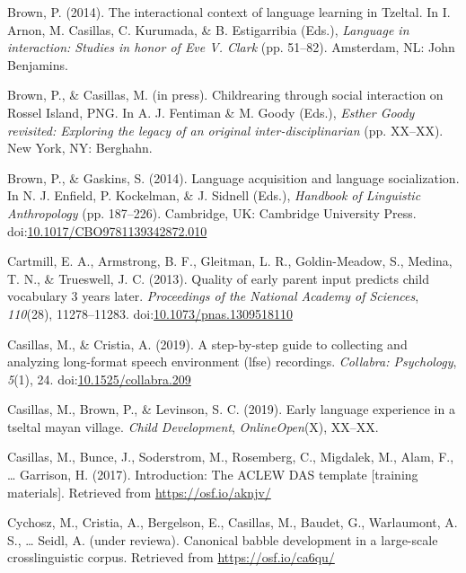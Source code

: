\documentclass[,man,floatsintext]{apa6}
\begin{document}
\hypertarget{ref-brown2014interactional}{}
Brown, P. (2014). The interactional context of language learning in
Tzeltal. In I. Arnon, M. Casillas, C. Kurumada, \& B. Estigarribia
(Eds.), \emph{Language in interaction: Studies in honor of Eve V. Clark}
(pp. 51--82). Amsterdam, NL: John Benjamins.

\hypertarget{ref-brownIPchildrearing}{}
Brown, P., \& Casillas, M. (in press). Childrearing through social
interaction on Rossel Island, PNG. In A. J. Fentiman \& M. Goody (Eds.),
\emph{Esther Goody revisited: Exploring the legacy of an original
inter-disciplinarian} (pp. XX--XX). New York, NY: Berghahn.

\hypertarget{ref-brown2014language}{}
Brown, P., \& Gaskins, S. (2014). Language acquisition and language
socialization. In N. J. Enfield, P. Kockelman, \& J. Sidnell (Eds.),
\emph{Handbook of Linguistic Anthropology} (pp. 187--226). Cambridge,
UK: Cambridge University Press.
doi:\href{https://doi.org/10.1017/CBO9781139342872.010}{10.1017/CBO9781139342872.010}

\hypertarget{ref-cartmill2013quality}{}
Cartmill, E. A., Armstrong, B. F., Gleitman, L. R., Goldin-Meadow, S.,
Medina, T. N., \& Trueswell, J. C. (2013). Quality of early parent input
predicts child vocabulary 3 years later. \emph{Proceedings of the
National Academy of Sciences}, \emph{110}(28), 11278--11283.
doi:\href{https://doi.org/10.1073/pnas.1309518110}{10.1073/pnas.1309518110}

\hypertarget{ref-casillas2019stepbystep}{}
Casillas, M., \& Cristia, A. (2019). A step-by-step guide to collecting
and analyzing long-format speech environment (lfse) recordings.
\emph{Collabra: Psychology}, \emph{5}(1), 24.
doi:\href{https://doi.org/10.1525/collabra.209}{10.1525/collabra.209}

\hypertarget{ref-casillas2019early}{}
Casillas, M., Brown, P., \& Levinson, S. C. (2019). Early language
experience in a tseltal mayan village. \emph{Child Development},
\emph{OnlineOpen}(X), XX--XX.

\hypertarget{ref-casillas2017ACLEWDAS}{}
Casillas, M., Bunce, J., Soderstrom, M., Rosemberg, C., Migdalek, M.,
Alam, F., \ldots{} Garrison, H. (2017). Introduction: The ACLEW DAS
template {[}training materials{]}. Retrieved from
\url{https://osf.io/aknjv/}

\hypertarget{ref-cychoszURcanonical}{}
Cychosz, M., Cristia, A., Bergelson, E., Casillas, M., Baudet, G.,
Warlaumont, A. S., \ldots{} Seidl, A. (under reviewa). Canonical babble
development in a large-scale crosslinguistic corpus. Retrieved from
\url{https://osf.io/ca6qu/}
\end{document}
